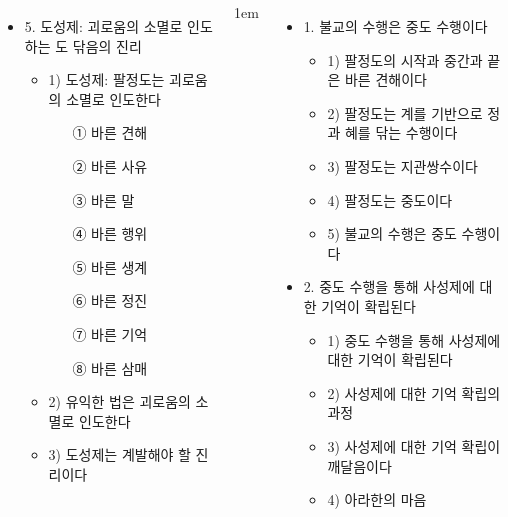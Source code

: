 \documentclass[	14pt, 
							a1paper, 
							portrait, %
							margin=0mm, %
							innermargin=10mm,  		%
							colspace=5mm, 
							subcolspace=0mm
							]{tikzposter}
\begin{document}
\begin{columns}
{\begin{itemize}
					\item 5. 도성제: 괴로움의 소멸로 인도하는 도 닦음의 진리
						\begin{itemize}
						\item 1) 도성제: 팔정도는 괴로움의 소멸로 인도한다
							\begin{itemize}
							\item [①] 바른 견해
							\item [②] 바른 사유
							\item [③] 바른 말
							\item [④] 바른 행위
							\item [⑤] 바른 생계
							\item [⑥] 바른 정진
							\item [⑦] 바른 기억
							\item [⑧] 바른 삼매
							\end{itemize}
						\item 2) 유익한 법은 괴로움의 소멸로 인도한다
						\item 3) 도성제는 계발해야 할 진리이다
						\end{itemize}

					\end{itemize}
			}





			{
					\setlength{\leftmargini}{2em}
					\setlength{\labelsep} {1em}
					\begin{itemize}
					\item 1. 불교의 수행은 중도 수행이다
						\begin{itemize}
						\item 1) 팔정도의 시작과 중간과 끝은 바른 견해이다
						\item 2) 팔정도는 계를 기반으로 정과 혜를 닦는 수행이다
						\item 3) 팔정도는 지관쌍수이다
						\item 4) 팔정도는 중도이다
						\item 5) 불교의 수행은 중도 수행이다
						\end{itemize}

					\item 2. 중도 수행을 통해 사성제에 대한 기억이 확립된다
						\begin{itemize}
						\item 1) 중도 수행을 통해 사성제에 대한 기억이 확립된다
						\item 2) 사성제에 대한 기억 확립의 과정
						\item 3) 사성제에 대한 기억 확립이 깨달음이다
						\item 4) 아라한의 마음
						\end{itemize}


\end{itemize}}
\end{columns}
\end{document}
